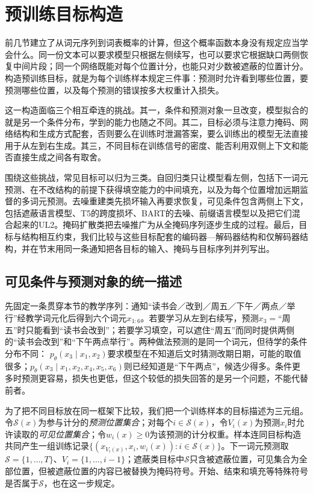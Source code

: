 \section{预训练目标构造}
\label{sec:nlp-llm-objectives}

前几节建立了从词元序列到词表概率的计算，但这个概率函数本身没有规定应当学会什么。同一份文本可以要求模型只根据左侧续写，也可以要求它根据缺口两侧恢复中间片段；同一个网络既能对每个位置计分，也能只对少数被遮蔽的位置计分。构造预训练目标，就是为每个训练样本规定三件事：预测时允许看到哪些位置，要预测哪些位置，以及每个预测的错误按多大权重计入损失。

这一构造面临三个相互牵连的挑战。其一，条件和预测对象一旦改变，模型拟合的就是另一个条件分布，学到的能力也随之不同。其二，目标必须与注意力掩码、网络结构和生成方式配套，否则要么在训练时泄漏答案，要么训练出的模型无法直接用于从左到右生成。其三，不同目标在训练信号的密度、能否利用双侧上下文和能否直接生成之间各有取舍。

围绕这些挑战，常见目标可以归为三类。自回归类只让模型看左侧，包括下一词元预测、在不改结构的前提下获得填空能力的中间填充，以及为每个位置增加远期监督的多词元预测。去噪重建类先损坏输入再要求恢复，可见条件包含两侧上下文，包括遮蔽语言模型、T5的跨度损坏、BART的去噪、前缀语言模型以及把它们混合起来的UL2。掩码扩散类把去噪推广为从全掩码序列逐步生成的过程。最后，目标与结构相互约束，我们比较与这些目标配套的编码器—解码器结构和仅解码器结构，并在节末用同一条通知把各目标的输入、掩码与目标序列并列写出。

\subsection{可见条件与预测对象的统一描述}
\label{sec:nlp-llm-objective-visibility}
\label{sec:nlp-llm-objective-loss}

先固定一条贯穿本节的教学序列：通知“读书会／改到／周五／下午／两点／举行”经教学词元化后得到六个词元$x_{1:6}$。若要学习从左到右续写，预测$x_3=$“周五”时只能看到“读书会改到”；若要学习填空，可以遮住“周五”而同时提供两侧的“读书会改到”和“下午两点举行”。两种做法预测的是同一个词元，但待学的条件分布不同：
$p_\theta(x_3\mid x_1,x_2)$要求模型在不知道后文时猜测改期日期，可能的取值很多；$p_\theta(x_3\mid x_1,x_2,x_4,x_5,x_6)$则已经知道是“下午两点”，候选少得多。条件更多时预测更容易，损失也更低，但这个较低的损失回答的是另一个问题，不能代替前者。

为了把不同目标放在同一框架下比较，我们把一个训练样本的目标描述为三元组。令$\mathcal S(x)$为参与计分的\emph{预测位置集合}；对每个$i\in\mathcal S(x)$，令$V_i(x)$为预测$x_i$时允许读取的\emph{可见位置集合}；令$w_i(x)\geq0$为该预测的计分权重。样本连同目标构造共同产生一组训练记录$\{(x_{V_i(x)},x_i,w_i(x)):i\in\mathcal S(x)\}$。下一词元预测取$\mathcal S=\{1,\ldots,T\}$、$V_i=\{1,\ldots,i-1\}$；遮蔽类目标中$\mathcal S$只含被遮蔽位置，可见集合为全部位置，但被遮蔽位置的内容已被替换为掩码符号。开始、结束和填充等特殊符号是否属于$\mathcal S$，也在这一步规定。

